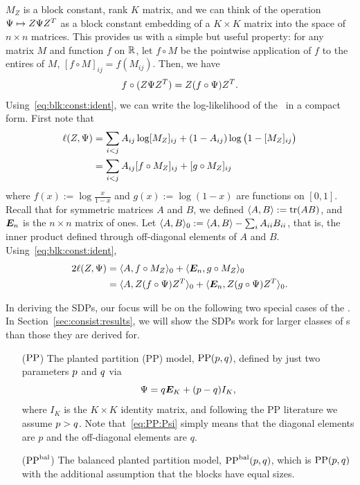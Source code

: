 $M_Z$ is a block constant, rank $K$ matrix, and we can think of the
operation $\Psi \mapsto Z \Psi Z^T$ as a block constant embedding of a $K
\times K$ matrix into the space of $n \times n$ matrices.   This
provides us with a simple but useful property:  for any matrix $M$ and function $f$ on $\mathbb{R}$, let $f \circ M$ be the pointwise application of $f$ to the entires of $M$, $[f \circ M]_{ij} = f(M_{ij})$. Then, we have 
\begin{align}\label{eq:blk:const:ident}
  f \circ (Z \Psi Z^T) = Z (f \circ \Psi) Z^T . 
\end{align}
Using~\eqref{eq:blk:const:ident}, we can write the log-likelihood of the
\SBM\ in a compact form. First note that
\begin{align*}
  \ell(Z,\Psi) &= \sum_{i <j} A_{ij} \log [M_Z]_{ij} +
  (1-A_{ij}) \log\big(1-[M_Z]_{ij}\big)  \\
  &= \sum_{i <j} A_{ij} [f\circ M_Z]_{ij} + [g\circ M_Z]_{ij} 
\end{align*}
where $f(x) := \log \frac{x}{1-x}$ and $g(x) := \log(1-x)$ are
functions on $[0,1]$. Recall that for symmetric matrices $A$ and $B$, we defined $\langle A,B\rangle := \operatorname*{tr}(AB)$, and $\bm{E}_n$ is the $n
\times n$ matrix of ones. Let $\langle A,B\rangle_0 := \langle A,B\rangle - \sum_i A_{ii} B_{ii}$, that is, the inner product defined through off-diagonal elements of $A$ and $B$. 
Using~\eqref{eq:blk:const:ident}, %
\begin{align}\label{eq:log:like:1}
  2\ell(Z,\Psi) &= \langle A, f\circ M_Z\rangle_0 + \langle \bm{E}_n, g\circ M_Z\rangle_0 \notag 
  \\&= \langle A, Z (f\circ \Psi) Z^T\rangle_0 + \langle \bm{E}_n, Z (g \circ \Psi) Z^T\rangle_0.  
\end{align}

In deriving the SDPs, our focus will be on the following two special cases of the \SBM.  In Section~\ref{sec:consist:results}, we will show the SDPs work for larger classes of \SBM s than those they are derived for.
\begin{itemize}
	\item[($\text{PP}$)] The planted partition (PP) model,
          $\text{PP}(p,q)$,  defined by just two parameters $p$ and
          $q$ via  
\begin{equation}\label{eq:PP:Psi}
  \Psi = q \bm{E}_K + (p-q) I_K, 
\end{equation}
 where $I_K$ is the $K \times K$ identity matrix, and following the PP
 literature we assume $p > q$. Note that~\eqref{eq:PP:Psi} simply means that the diagonal elements are $p$ and the off-diagonal elements are $q$.
	\item[($\text{PP}^{\text{bal}}$)] The balanced planted partition model,
          $\text{PP}^{\text{bal}}(p,q)$, which is  $\text{PP}(p,q)$ with the additional assumption that the blocks have equal sizes.
\end{itemize}


